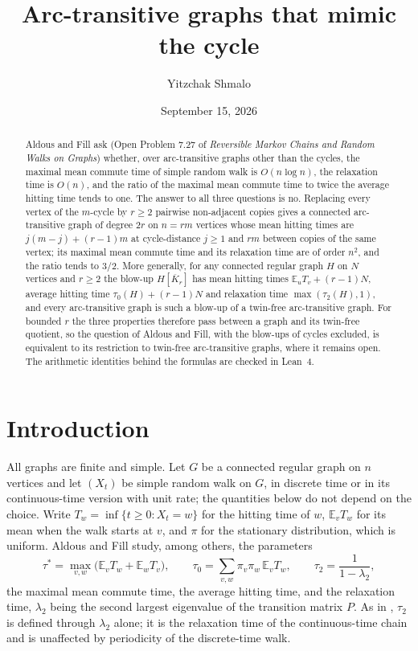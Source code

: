 \documentclass[11pt]{amsart}
\title[Arc-transitive graphs that mimic the cycle]{Arc-transitive graphs that mimic the cycle}
\author{Yitzchak Shmalo}
\date{September 15, 2026}
\theoremstyle{definition}
\newcommand{\E}{\mathbb{E}}
\newcommand{\Kbar}{\overline{K}}
\begin{document}
\begin{abstract}
Aldous and Fill ask (Open Problem 7.27 of \emph{Reversible Markov Chains and Random Walks on Graphs}) whether, over arc-transitive graphs other than the cycles, the maximal mean commute time of simple random walk is $O(n\log n)$, the relaxation time is $O(n)$, and the ratio of the maximal mean commute time to twice the average hitting time tends to one. The answer to all three questions is no. Replacing every vertex of the $m$-cycle by $r\ge2$ pairwise non-adjacent copies gives a connected arc-transitive graph of degree $2r$ on $n=rm$ vertices whose mean hitting times are $j(m-j)+(r-1)m$ at cycle-distance $j\ge1$ and $rm$ between copies of the same vertex; its maximal mean commute time and its relaxation time are of order $n^2$, and the ratio tends to $3/2$. More generally, for any connected regular graph $H$ on $N$ vertices and $r\ge2$ the blow-up $H[\Kbar_r]$ has mean hitting times $\E_uT_v+(r-1)N$, average hitting time $\tau_0(H)+(r-1)N$ and relaxation time $\max(\tau_2(H),1)$, and every arc-transitive graph is such a blow-up of a twin-free arc-transitive graph. For bounded $r$ the three properties therefore pass between a graph and its twin-free quotient, so the question of Aldous and Fill, with the blow-ups of cycles excluded, is equivalent to its restriction to twin-free arc-transitive graphs, where it remains open. The arithmetic identities behind the formulas are checked in Lean~4.
\end{abstract}

\maketitle

\section{Introduction}

All graphs are finite and simple. Let $G$ be a connected regular graph on $n$ vertices and let $(X_t)$ be simple random walk on $G$, in discrete time or in its continuous-time version with unit rate; the quantities below do not depend on the choice. Write $T_w=\inf\{t\ge0:X_t=w\}$ for the hitting time of $w$, $\E_vT_w$ for its mean when the walk starts at $v$, and $\pi$ for the stationary distribution, which is uniform. Aldous and Fill \cite{AF} study, among others, the parameters
\begin{equation}\label{eq:params}
\tau^*=\max_{v,w}\big(\E_vT_w+\E_wT_v\big),\qquad
\tau_0=\sum_{v,w}\pi_v\pi_w\,\E_vT_w,\qquad
\tau_2=\frac1{1-\lambda_2},
\end{equation}
the maximal mean commute time, the average hitting time, and the relaxation time, $\lambda_2$ being the second largest eigenvalue of the transition matrix $P$. As in \cite{AF}, $\tau_2$ is defined through $\lambda_2$ alone; it is the relaxation time of the continuous-time chain and is unaffected by periodicity of the discrete-time walk.
\end{document}
